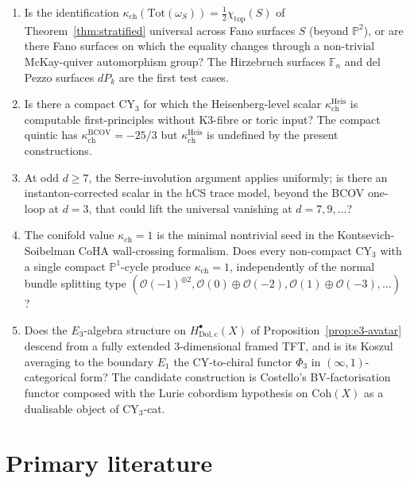 \documentclass[11pt]{article}
\providecommand{\cO}{\mathcal{O}}
\providecommand{\Tot}{\mathrm{Tot}}
\begin{document}
\begin{enumerate}
\item Is the identification
      $\kappa_{\mathrm{ch}}(\Tot(\omega_{S}))=\tfrac12\chi_{\mathrm{top}}(S)$
      of Theorem~\ref{thm:stratified} universal across Fano surfaces
      $S$ (beyond $\mathbb{P}^{2}$), or are there Fano surfaces on which
      the equality changes through a non-trivial McKay-quiver
      automorphism group? The Hirzebruch surfaces $\mathbb{F}_{n}$ and
      del Pezzo surfaces $dP_{k}$ are the first test cases.
\item Is there a compact CY$_{3}$ for which the Heisenberg-level scalar
      $\kappa_{\mathrm{ch}}^{\mathrm{Heis}}$ is computable first-principles
      without K3-fibre or toric input? The compact quintic has
      $\kappa_{\mathrm{ch}}^{\mathrm{BCOV}}=-25/3$ but
      $\kappa_{\mathrm{ch}}^{\mathrm{Heis}}$ is undefined by the present
      constructions.
\item At odd $d\ge 7$, the Serre-involution argument applies uniformly;
      is there an instanton-corrected scalar in the hCS trace model, beyond
      the BCOV one-loop at $d=3$, that could lift the universal
      vanishing at $d=7,9,\dots$?
\item The conifold value $\kappa_{\mathrm{ch}}=1$ is the minimal
      nontrivial seed in the Kontsevich-Soibelman CoHA
      wall-crossing formalism. Does every non-compact CY$_{3}$ with a
      single compact $\mathbb{P}^{1}$-cycle produce
      $\kappa_{\mathrm{ch}}=1$, independently of the normal bundle
      splitting type $(\cO(-1)^{\oplus 2}, \cO(0)\oplus\cO(-2), \cO(1)\oplus\cO(-3),\dots)$?
\item Does the $E_{3}$-algebra structure on
      $H^{\bullet}_{\mathrm{Dol,c}}(X)$ of Proposition~\ref{prop:e3-avatar}
      descend from a fully extended $3$-dimensional framed TFT, and is
      its Koszul averaging to the boundary $E_{1}$ the CY-to-chiral
      functor $\Phi_{3}$ in $(\infty,1)$-categorical form? The
      candidate construction is Costello's BV-factorisation functor
      composed with the Lurie cobordism hypothesis on $\mathrm{Coh}(X)$
      as a dualisable object of $\mathrm{CY}_{3}$-cat.
\end{enumerate}

\appendix

\section{Primary literature}
\label{sec:primary}
\end{document}
